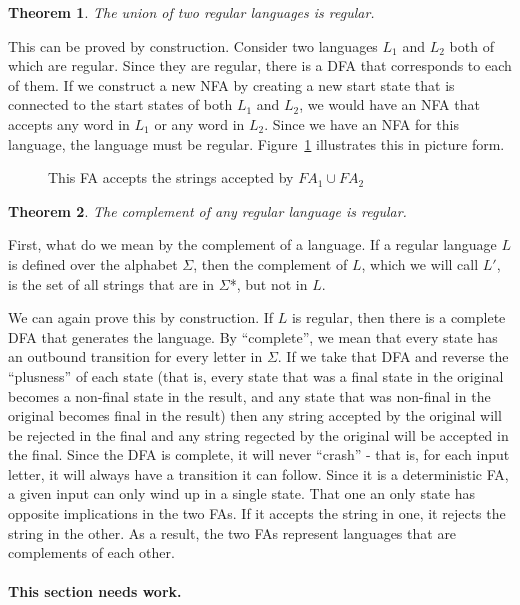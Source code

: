 \documentclass[letterpaper,12pt,openany,reqno]{book}%
\newcommand{\needswork}{\paragraph{This section needs work.}}
\newcommand{\fanonterminalnode}[2] {\node at (#1) (#2) [circle, draw, minimum size=24pt] {#2};}
\newcommand{\fatransition}[3] {\draw [-{Latex[length=3mm,width=2.5mm]}] (#1) -- (#2) node [midway, above] {#3};}
\newtheorem{theorem}{Theorem}
\begin{document}
\begin{theorem}
The union of two regular languages is regular.
\end{theorem}
This can be proved by construction. Consider two languages $L_1$ and $L_2$ both of which are regular. Since they are regular, there is a DFA that corresponds to each of them. If we construct a new NFA by creating a new start state that is connected to the start states of both $L_1$ and $L_2$, we would have an NFA that accepts any word in $L_1$ or any word in $L_2$. Since we have an NFA for this language, the language must be regular. Figure~\ref{F.union.re} illustrates this in picture form.

\begin{figure}[hbt]
\centering
{}
\caption[Union of to regular expressions]{This FA accepts the strings accepted by $FA_1 \cup FA_2$}
\label{F.union.re}
\end{figure}

\begin{theorem}
The complement of any regular language is regular.
\end{theorem}
First, what do we mean by the complement of a language. If a regular language $L$ is defined over the alphabet $\Sigma$, then the complement of $L$, which we will call $L'$, is the set of all strings that are in $\Sigma$*, but not in $L$.

We can again prove this by construction. If $L$ is regular, then there is a complete DFA that generates the language. By ``complete'', we mean that every state has an outbound transition for every letter in $\Sigma$. If we take that DFA and reverse the ``plusness'' of each state (that is, every state that was a final state in the original becomes a non-final state in the result, and any state that was non-final in the original becomes final in the result) then any string accepted by the original will be rejected in the final and any string regected by the original will be accepted in the final. Since the DFA is complete, it will never ``crash'' - that is, for each input letter, it will always have a transition it can follow. Since it is a deterministic FA, a given input can only wind up in a single state. That one an only state has opposite implications in the two FAs. If it accepts the string in one, it rejects the string in the other. As a result, the two FAs represent languages that are complements of each other.
\needswork %
\end{document}
